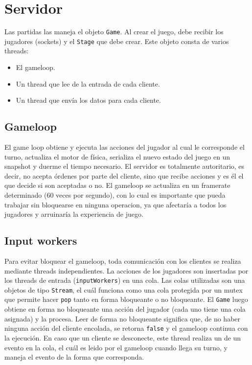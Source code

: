 \section{Servidor}

Las partidas las maneja el objeto \texttt{Game}. Al crear el juego, debe recibir los jugadores (sockets) y el
\texttt{Stage} que debe crear. Este objeto consta de varios threads:

\begin{itemize}
    \item El gameloop.
    \item Un thread que lee de la entrada de cada cliente.
    \item Un thread que env\'ia los datos para cada cliente.
\end{itemize}


\subsection{Gameloop}

El game loop obtiene y ejecuta las acciones del jugador al cual le corresponde el turno, actualiza el motor de f\'isica,
serializa el nuevo estado del juego en un snapshot y duerme el tiempo necesario. El servidor es totalmente autoritario,
es decir, no acepta \'ordenes por parte del cliente, sino que recibe acciones y es \'el el que decide si son
aceptadas o no. El gameloop se actualiza en un framerate determinado (60 veces por segundo), con lo cual es importante
que pueda trabajar sin bloquearse en ninguna operacion, ya que afectar\'ia a todos los jugadores y arruinar\'ia la
experiencia de juego.


\subsection{Input workers}

Para evitar bloquear el gameloop, toda comunicaci\'on con los clientes se realiza mediante threads independientes. La acciones de los jugadores
son insertadas por los threads de entrada (\texttt{inputWorkers}) en una cola. Las colas utilizadas son
una objetos de tipo \texttt{Stream}, el cu\'al funciona como una cola protegida por un mutex que permite
hacer \texttt{pop} tanto en forma bloqueante o no bloqueante. El \texttt{Game} luego obtiene
en forma no bloqueante una acci\'on del jugador (cada uno tiene una cola asignada) y la procesa. Leer de forma
no bloqueante significa que, de no haber ninguna acci\'on del cliente encolada, se retorna \texttt{false} y
el gameloop continua con la ejecuci\'on. En caso que un cliente se desconecte, este thread realiza un 
de un evento  en la cola, el cu\'al es leido por el gameloop cuando llega su turno, y maneja
el evento de la forma que corresponda.


